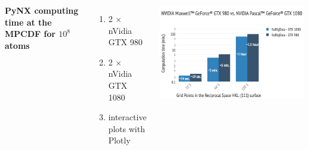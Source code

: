 \documentclass[]{beamer}
\begin{document}
\begin{frame}
\begin{columns}
\begin{minipage}[c][0.4\textheight][c]{\linewidth}
\end{minipage}
\begin{minipage}[c][0.4\textheight][c]{\linewidth}
  \textbf{PyNX computing time at the MPCDF for $10^{8}$ atoms}
  \begin{enumerate}
  \item 2 $\times$ nVidia GTX 980   
  \item 2 $\times$ nVidia GTX 1080
  \item interactive plots with Plotly 
  \end{enumerate}
\end{minipage}
\begin{minipage}[c][0.4\textheight][c]{\linewidth}
  \centering
  \includegraphics[width=0.8\linewidth]{pics/PyNX_runtest_PascalvsMaxwell_gpu.png}
\end{minipage}
\end{columns}
\end{frame}
\end{document}
